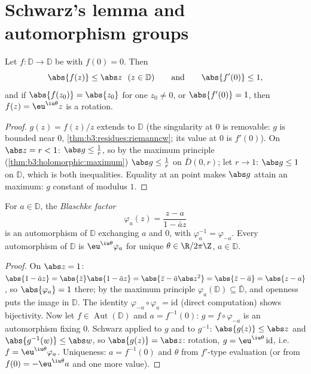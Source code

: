 \section{Schwarz's lemma and automorphism groups}

\begin{theorem}\label{thm:b3:conformal:schwarz}
Let $f \colon \mathbb D \to \mathbb D$ be  with
$f(0) = 0$. Then
\[
\abs{f(z)} \leq \abs z \ \ (z \in \mathbb D)
\qquad\text{and}\qquad \abs{f'(0)} \leq 1 ,
\]
and if $\abs{f(z_0)} = \abs{z_0}$ for one $z_0 \neq 0$, or
$\abs{f'(0)} = 1$, then $f(z) = \eu^{\iu\theta}z$ is a
rotation.
\end{theorem}

\begin{proof}
$g(z) = f(z)/z$ extends  to $\mathbb D$ (the
singularity at $0$ is removable: $g$ is bounded near $0$,
\cref{thm:b3:residues:riemanncw}; its value at $0$ is
$f'(0)$). On $\abs z = r < 1$: $\abs g \leq \frac1r$, so by
the maximum principle (\cref{thm:b3:holomorphic:maximum})
$\abs g \leq \frac1r$ on $\bar D(0,r)$; let $r \to 1$: $\abs
g \leq 1$ on $\mathbb D$, which is both inequalities. Equality
at an  point makes $\abs g$ attain an 
maximum: $g$ constant of modulus $1$.
\end{proof}

\begin{theorem}
\label{thm:b3:conformal:autdisc}
For $a \in \mathbb D$, the \emph{Blaschke
factor}
\[
\varphi_a(z) = \frac{z - a}{1 - \bar a z}
\]
is an automorphism of $\mathbb D$ exchanging $a$ and $0$, with
$\varphi_a^{-1} = \varphi_{-a}$. Every automorphism of
$\mathbb D$ is $\eu^{\iu\theta}\varphi_a$ for unique $\theta
\in \R/2\pi\Z$, $a \in \mathbb D$.
\end{theorem}

\begin{proof}
On $\abs z = 1$: $\abs{1 - \bar az} = \abs{\bar z}\abs{1 -
\bar az} = \abs{\bar z - \bar a\abs z^2} = \abs{\bar z - \bar
a} = \abs{z - a}$, so $\abs{\varphi_a} = 1$ there; by the
maximum principle $\varphi_a(\mathbb D) \subseteq \bar{\mathbb
D}$, and openness puts the image in $\mathbb D$. The 
identity $\varphi_{-a}\circ\varphi_a = \mathrm{id}$ (direct
computation) shows bijectivity. Now let $f \in
\operatorname{Aut}(\mathbb D)$ and $a = f^{-1}(0)$: $g =
f\circ\varphi_{-a}$ is an automorphism fixing $0$. Schwarz
applied to $g$ and to $g^{-1}$: $\abs{g(z)} \leq \abs z$ and
$\abs{g^{-1}(w)} \leq \abs w$, so $\abs{g(z)} = \abs z$:
rotation, $g = \eu^{\iu\theta}\,\mathrm{id}$, i.e.\ $f =
\eu^{\iu\theta}\varphi_a$. Uniqueness: $a = f^{-1}(0)$ and
$\theta$ from $f'$-type evaluation (or from $f(0) =
-\eu^{\iu\theta}a$ and one more value).
\end{proof}

